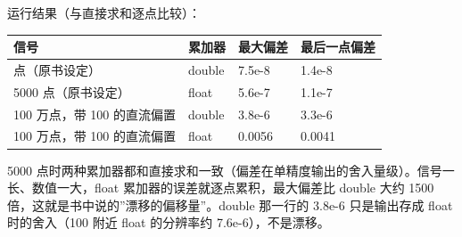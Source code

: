 运行结果（与直接求和逐点比较）：

{\def\LTcaptype{none} %
\begin{longtable}[]{@{}llll@{}}
\toprule\noalign{}
信号 & 累加器 & 最大偏差 & 最后一点偏差 \\
\midrule\noalign{}
\endhead
\bottomrule\noalign{}
\endlastfoot
5000 点（原书设定） & double & 7.5e-8 & 1.4e-8 \\
5000 点（原书设定） & float & 5.6e-7 & 1.1e-7 \\
100 万点，带 100 的直流偏置 & double & 3.8e-6 & 3.3e-6 \\
100 万点，带 100 的直流偏置 & float & 0.0056 & 0.0041 \\
\end{longtable}
}

5000
点时两种累加器都和直接求和一致（偏差在单精度输出的舍入量级）。信号一长、数值一大，float
累加器的误差就逐点累积，最大偏差比 double 大约 1500
倍，这就是书中说的''漂移的偏移量''。double 那一行的 3.8e-6 只是输出存成
float 时的舍入（100 附近 float 的分辨率约 7.6e-6），不是漂移。
